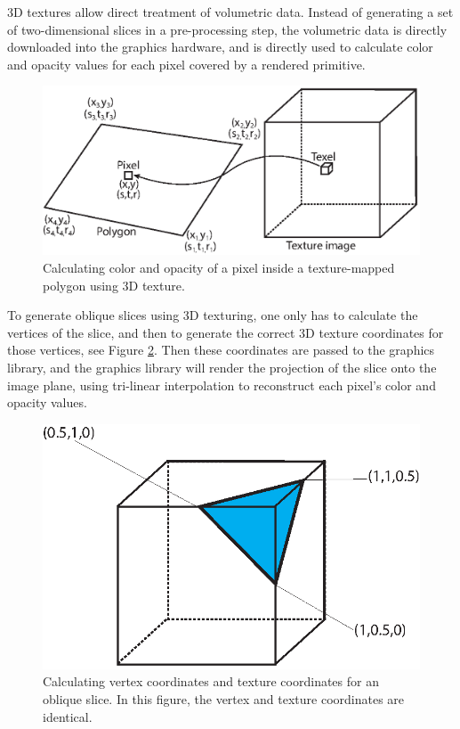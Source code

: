 3D textures allow direct treatment of volumetric data. Instead of generating a set of two-dimensional slices in a pre-processing step, the volumetric data is directly downloaded into the graphics hardware, and is directly used to calculate color and opacity values for each pixel covered by a rendered primitive.

\begin{figure}[th]
\centering
\includegraphics{Figures/3dtexmapping}
\decoRule
\caption[3D texture mapping]{Calculating color and opacity of a pixel inside a texture-mapped polygon using 3D texture.}
\label{fig:3dtexture}
\end{figure}


To generate oblique slices using 3D texturing, one only has to calculate the vertices of the slice, and then to generate the correct 3D texture coordinates for those vertices, see Figure \ref{fig:cubeSlice}. Then these coordinates are passed to the graphics library, and the graphics library will render the projection of the slice onto the image plane, using tri-linear interpolation to reconstruct each pixel's color and opacity values.

\begin{figure}[th]
\centering
\includegraphics{Figures/cubeSlice}
\decoRule
\caption[3D Cube slice]{Calculating vertex coordinates and texture coordinates for an oblique slice. In this figure, the vertex and texture coordinates are identical.}
\label{fig:cubeSlice}
\end{figure}

